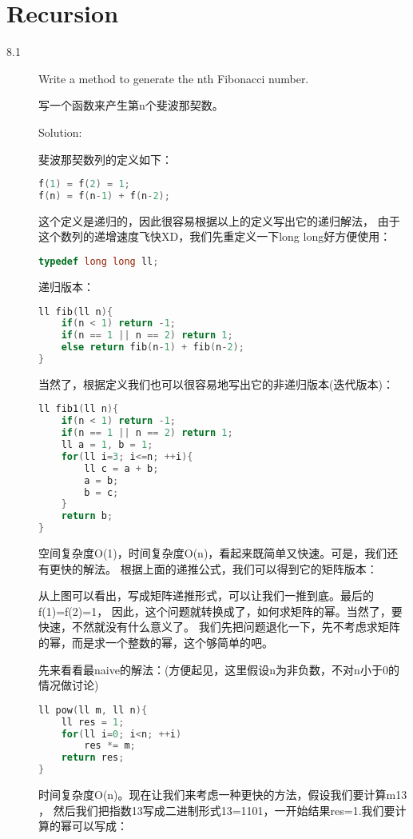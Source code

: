 \chapter{Recursion}
\small{}

\begin{description}
\item[8.1] Write a method to generate the nth Fibonacci number.

写一个函数来产生第n个斐波那契数。

Solution: 

斐波那契数列的定义如下：
\begin{lstlisting}[language=C++]
f(1) = f(2) = 1;
f(n) = f(n-1) + f(n-2);
\end{lstlisting}
这个定义是递归的，因此很容易根据以上的定义写出它的递归解法， 由于这个数列的递增速度飞快XD，我们先重定义一下long long好方便使用：
\begin{lstlisting}[language=C++]
typedef long long ll;
\end{lstlisting}
递归版本：
\begin{lstlisting}[language=C++]
ll fib(ll n){
    if(n < 1) return -1;
    if(n == 1 || n == 2) return 1;
    else return fib(n-1) + fib(n-2);
}
\end{lstlisting}
当然了，根据定义我们也可以很容易地写出它的非递归版本(迭代版本)：
\begin{lstlisting}[language=C++]
ll fib1(ll n){
    if(n < 1) return -1;
    if(n == 1 || n == 2) return 1;
    ll a = 1, b = 1;
    for(ll i=3; i<=n; ++i){
        ll c = a + b;
        a = b;
        b = c;
    }
    return b;
}
\end{lstlisting}

空间复杂度O(1)，时间复杂度O(n)，看起来既简单又快速。可是，我们还有更快的解法。 根据上面的递推公式，我们可以得到它的矩阵版本：

从上图可以看出，写成矩阵递推形式，可以让我们一推到底。最后的f(1)=f(2)=1， 因此，这个问题就转换成了，如何求矩阵的幂。当然了，要快速，不然就没有什么意义了。 我们先把问题退化一下，先不考虑求矩阵的幂，而是求一个整数的幂，这个够简单的吧。

先来看看最naive的解法：(方便起见，这里假设n为非负数，不对n小于0的情况做讨论)
\begin{lstlisting}[language=C++]
ll pow(ll m, ll n){
    ll res = 1;
    for(ll i=0; i<n; ++i)
        res *= m;
    return res;
}
\end{lstlisting}
时间复杂度O(n)。现在让我们来考虑一种更快的方法，假设我们要计算m13 ， 然后我们把指数13写成二进制形式13=1101，一开始结果res=1.我们要计算的幂可以写成：


\end{description}

